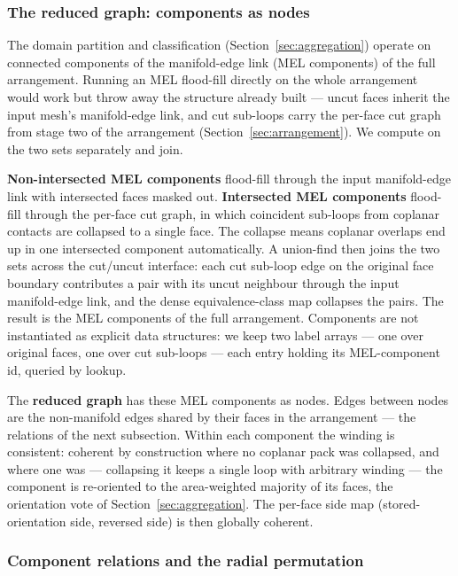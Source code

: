 \documentclass{egpubl}
\begin{document}
\subsubsection*{The reduced graph: components as nodes}

The domain partition and classification (Section~\ref{sec:aggregation}) operate on connected components of the manifold-edge link (MEL components) of the full arrangement. Running an MEL flood-fill directly on the whole arrangement would work but throw away the structure already built --- uncut faces inherit the input mesh's manifold-edge link, and cut sub-loops carry the per-face cut graph from stage two of the arrangement (Section~\ref{sec:arrangement}). We compute on the two sets separately and join.

\textbf{Non-intersected MEL components} flood-fill through the input manifold-edge link with intersected faces masked out. \textbf{Intersected MEL components} flood-fill through the per-face cut graph, in which coincident sub-loops from coplanar contacts are collapsed to a single face. The collapse means coplanar overlaps end up in one intersected component automatically. A union-find then joins the two sets across the cut/uncut interface: each cut sub-loop edge on the original face boundary contributes a pair with its uncut neighbour through the input manifold-edge link, and the dense equivalence-class map collapses the pairs. The result is the MEL components of the full arrangement. Components are not instantiated as explicit data structures: we keep two label arrays --- one over original faces, one over cut sub-loops --- each entry holding its MEL-component id, queried by lookup.

The \textbf{reduced graph} has these MEL components as nodes. Edges between nodes are the non-manifold edges shared by their faces in the arrangement --- the relations of the next subsection. Within each component the winding is consistent: coherent by construction where no coplanar pack was collapsed, and where one was --- collapsing it keeps a single loop with arbitrary winding --- the component is re-oriented to the area-weighted majority of its faces, the orientation vote of Section~\ref{sec:aggregation}. The per-face side map (stored-orientation side, reversed side) is then globally coherent.



\subsubsection*{Component relations and the radial permutation}
\end{document}
